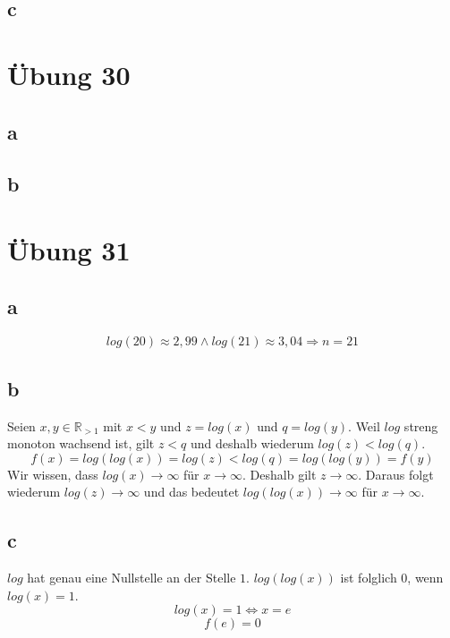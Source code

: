 \documentclass[a4paper,10pt]{article}
\begin{document}
\subsection*{c}

\section*{Übung 30}

\subsection*{a}

\subsection*{b}

\section*{Übung 31}

\subsection*{a}

\begin{equation}
 log(20) \approx 2,99 \land log(21) \approx 3,04 \Rightarrow n = 21
\end{equation}

\subsection*{b}

Seien $x, y \in \mathbb{R}_{> 1}$ mit $x < y$ und $z = log(x)$ und $q = log(y)$.
Weil $log$ streng monoton wachsend ist, gilt $z < q$ und deshalb wiederum $log(z) < log(q)$.
\begin{equation}
 f(x) = log(log(x)) = log(z) < log(q) = log(log(y)) = f(y)
\end{equation}
Wir wissen, dass $log(x) \rightarrow \infty$ für $x \rightarrow \infty$.
Deshalb gilt $z \rightarrow \infty$.
Daraus folgt wiederum $log(z) \rightarrow \infty$ und das bedeutet $log(log(x)) \rightarrow \infty$ für $x \rightarrow \infty$.

\subsection*{c}

$log$ hat genau eine Nullstelle an der Stelle $1$.
$log(log(x))$ ist folglich $0$, wenn $log(x) = 1$.
\begin{equation}
 log(x) = 1 \Leftrightarrow x = e
\end{equation}
\begin{equation}
 f(e) = 0
\end{equation}
\end{document}
